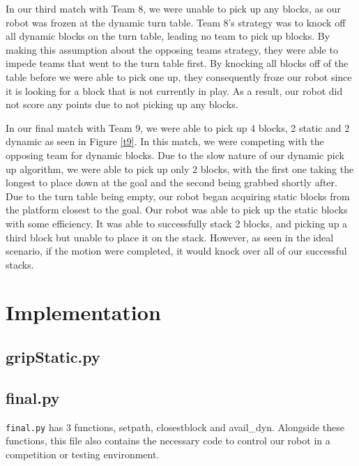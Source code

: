 \documentclass{article}
\begin{document}
In our third match with Team 8, we were unable to pick up any blocks, as our robot was frozen at the dynamic turn table.  Team 8's strategy was to knock off all dynamic blocks on the turn table, leading no team to pick up blocks.  By making this assumption about the opposing teams strategy, they were able to impede teams that went to the turn table first.  By knocking all blocks off of the table before we were able to pick one up, they consequently froze our robot since it is looking for a block that is not currently in play.  As a result, our robot did not score any points due to not picking up any blocks.

In our final match with Team 9, we were able to pick up 4 blocks, 2 static and 2 dynamic as seen in Figure \ref{t9}.  In this match, we were competing with the opposing team for dynamic blocks.  Due to the slow nature of our dynamic pick up algorithm, we were able to pick up only 2 blocks, with the first one taking the longest to place down at the goal and the second being grabbed shortly after.  Due to the turn table being empty, our robot began acquiring static blocks from the platform closest to the goal.  Our robot was able to pick up the static blocks with some efficiency.  It was able to successfully stack 2 blocks, and picking up a third block but unable to place it on the stack.  However, as seen in the ideal scenario, if the motion were completed, it would knock over all of our successful stacks.

\section{Implementation}

\subsection{gripStatic.py}


\subsection{final.py}
    \verb|final.py| has 3 functions, setpath, closestblock and avail\_dyn.  Alongside these functions, this file also contains the necessary code to control our robot in a competition or testing environment.  
    
\end{document}
